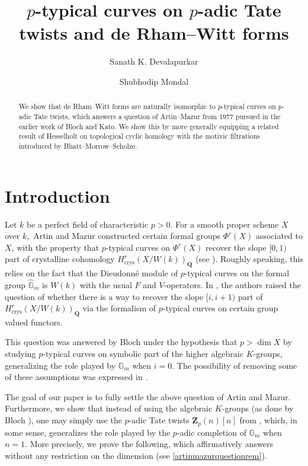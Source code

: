 \documentclass[10pt,letterpaper]{amsart}
\title{ $p$-typical curves on $p$-adic Tate twists and de Rham--Witt forms}
\author{Sanath K. Devalapurkar}
\author{Shubhodip Mondal}
\newcommand{\stodo}[1]{{\todo[size = \tiny]{#1}}}
\numberwithin{figure}{section}
\numberwithin{equation}{section}
\theoremstyle{definition}
\theoremstyle{definition}
\theoremstyle{definition}
\theoremstyle{definition}
\DeclareMathOperator{\crys}{crys}
\newcommand{\Z}{\mathbf{Z}}
\newcommand{\Q}{\mathbf{Q}}
\begin{document}
\begin{abstract}
We show that de Rham--Witt forms are naturally isomorphic to $p$-typical curves on $p$-adic Tate twists, which answers a question of Artin--Mazur from 1977 pursued in the earlier work of Bloch and Kato. We show this by more generally equipping a related result of Hesselholt on topological cyclic homology with the motivic filtrations introduced by Bhatt--Morrow--Scholze.
\end{abstract}
\maketitle
\vspace{-8.5mm}
\tableofcontents

\section{Introduction}
Let $k$ be a perfect field of characteristic $p>0.$ For a smooth proper scheme $X$ over $k,$ Artin and Mazur \cite{AM} constructed certain formal groups $\Phi^r(X)$ associated to $X$, with the property that $p$-typical curves on $\Phi^r(X)$ recover the slope $[0,1)$ part of crystalline cohomology $H^r_{\crys} (X/W(k))_{\Q}$ (see \cite[Cor.~3.3]{AM}). Roughly speaking, this relies on the fact that the Dieudonn\'e module of $p$-typical curves on the formal group $\widehat{\mathbb G}_m$ is $W(k)$ with the usual $F$ and $V$-operators. In \cite[Qn.~(b)]{AM}, the authors raised the question of whether there is a way to recover the slope $[i,i+1)$ part of $H^r_{\crys} (X/W(k))_{\Q}$ via the formalism of $p$-typical curves on certain group valued functors.

This question was answered by Bloch \cite{bloch} under the hypothesis that $p > \dim X$ by studying $p$-typical curves on symbolic part of the higher algebraic $K$-groups, generalizing the role played by ${{\mathbb G}}_m$ when $i=0.$ The possibility of removing some of these assumptions was expressed in  \cite[p.~635, Rmk.~2]{Kato}.

The goal of our paper is to fully settle the above question of Artin and Mazur. Furthermore, we show that instead of using the algebraic $K$-groups (as done by Bloch \cite{bloch}), one may simply use the $p$-adic Tate twists $\Z_p (n)[n]$ from \cite{BMS2}, which, in some sense, generalizes the role played by the $p$-adic completion of $\mathbb G_m$ when $n=1.$ More precisely, we prove the following, which affirmatively answers \cite[Qn.~(b)]{AM} without any restriction on the dimension (see \cref{artinmazurquestionrem}).
\end{document}
